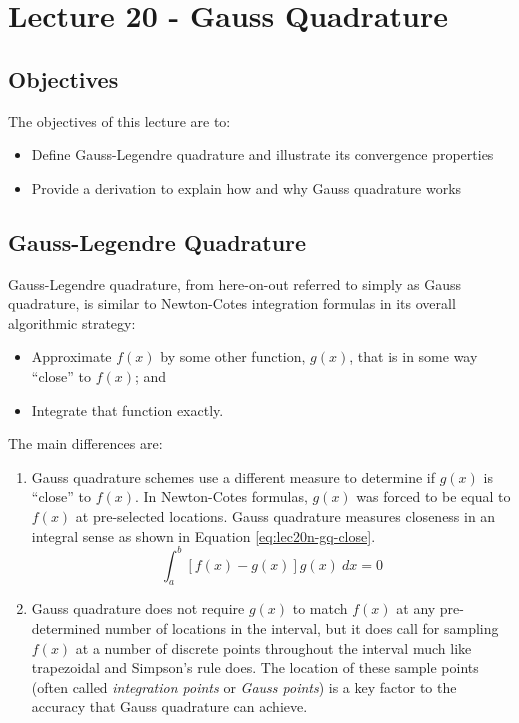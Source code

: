 \chapter{Lecture 20 - Gauss Quadrature}
\label{ch:lec20n}
\section{Objectives}
The objectives of this lecture are to:
\begin{itemize}
\item Define Gauss-Legendre quadrature and illustrate its convergence properties
\item Provide a derivation to explain how and why Gauss quadrature works
\end{itemize}
\setcounter{lstannotation}{0}

\section{Gauss-Legendre Quadrature}
Gauss-Legendre quadrature, from here-on-out referred to simply as Gauss quadrature, is similar to Newton-Cotes integration formulas in its overall algorithmic strategy:
\begin{itemize}
\item Approximate $f(x)$ by some other function, $g(x)$, that is in some way ``close'' to $f(x)$; and
\item Integrate that function exactly.
\end{itemize}
The main differences are:
\begin{enumerate}
\item Gauss quadrature schemes use a different measure to determine if $g(x)$ is ``close'' to $f(x)$.  In Newton-Cotes formulas, $g(x)$ was forced to be equal to $f(x)$ at pre-selected locations.  Gauss quadrature measures closeness in an integral sense as shown in Equation \ref{eq:lec20n-gq-close}.
\begin{equation}
\int_{a}^{b}\left[f(x) - g(x)\right]g(x) \ dx = 0
\label{eq:lec20n-gq-close}
\end{equation}
\item Gauss quadrature does not require $g(x)$ to match $f(x)$ at any pre-determined number of locations in the interval, but it does call for sampling $f(x)$ at a number of discrete points throughout the interval much like trapezoidal and Simpson's rule does.  The location of these sample points (often called \emph{integration points} or \emph{Gauss points}) is a key factor to the accuracy that Gauss quadrature can achieve.
\end{enumerate}


